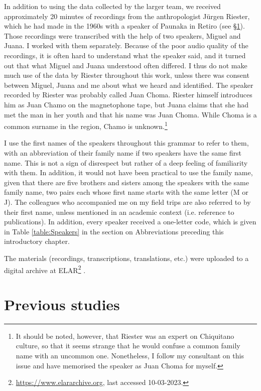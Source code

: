 In addition to using the data collected by the larger team, we received approximately 20 minutes of recordings from the anthropologist Jürgen Riester, which he had made in the 1960s with a speaker of Paunaka in Retiro (see §\ref{sec:PreviousWork}). Those recordings were transcribed with the help of two speakers, Miguel and Juana. I worked with them separately. Because of the poor audio quality of the recordings, it is often hard to understand what the speaker said, and it turned out that what Miguel and Juana understood often differed. I thus do not make much use of the data by Riester throughout this work, unless there was consent between Miguel, Juana and me about what we heard and identified. The speaker recorded by Riester was probably called Juan Choma. Riester himself introduces him as Juan Chamo on the magnetophone tape, but Juana claims that she had met the man in her youth and that his name was Juan Choma. While Choma is a common surname in the region, Chamo is unknown.\footnote{It should be noted, however, that Riester was an expert on Chiquitano culture, so that it seems strange that he would confuse a common family name with an uncommon one. Nonetheless, I follow my consultant on this issue and have memorised the speaker as Juan Choma for myself.}

I use the first names of the speakers throughout this grammar to refer to them, with an abbreviation of their family name if two speakers have the same first name. This is not a sign of disrespect but rather of a deep feeling of familiarity with them. In addition, it would not have been practical to use the family name, given that there are five brothers and sisters among the speakers with the same family name, two pairs each whose first name starts with the same letter (M or J). The colleagues who accompanied me on my field trips are also referred to by their first name, unless mentioned in an academic context (i.e. reference to publications). In addition, every speaker received a one-letter code, which is given in Table \ref{table:Speakers} in the section on Abbreviations preceding this introductory chapter.

The materials (recordings, transcriptions, translations, etc.) were uploaded to a digital archive at ELAR\footnote{\url{https://www.elararchive.org}, last accessed 10-03-2023.} \citep[]{PDP_Archive2015}.

\section{Previous studies}\label{sec:PreviousWork}

